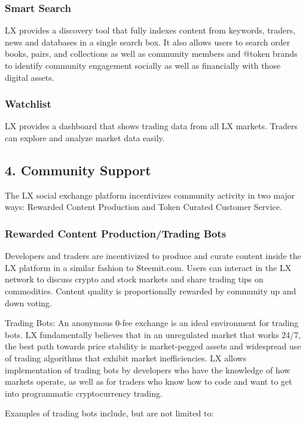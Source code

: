 \documentclass[11pt]{article}
\begin{document}
\subsubsection{Smart Search}

LX provides a discovery tool that fully indexes content from keywords, traders, news and databases in a single search box.  It also allows users to search order books, pairs, and collections as well as community members and @token brands to identify community engagement socially as well as financially with those digital assets.


\subsubsection{Watchlist}

LX provides a dashboard that shows trading data from all LX markets. Traders can explore and analyze market data easily.


\subsection{4. Community Support}

The LX social exchange platform incentivizes community activity in two major ways: Rewarded Content Production and Token Curated Customer Service.


\subsubsection{Rewarded Content Production/Trading Bots}

Developers and traders are incentivized to produce and curate content inside the LX platform in a similar fashion to Steemit.com. Users can interact in the LX network to discuss crypto and stock markets and share trading tips on commodities. Content quality is proportionally rewarded by community up and down voting.


Trading Bots: An anonymous 0-fee exchange is an ideal environment for trading bots. LX fundamentally believes that in an unregulated market that works 24/7, the best path towards price stability is market-pegged assets and widespread use of trading algorithms that exhibit market inefficiencies. LX allows implementation of trading bots by developers who have the knowledge of how markets operate, as well as for traders who know how to code and want to get into programmatic cryptocurrency trading.


Examples of trading bots include, but are not limited to:
\end{document}
